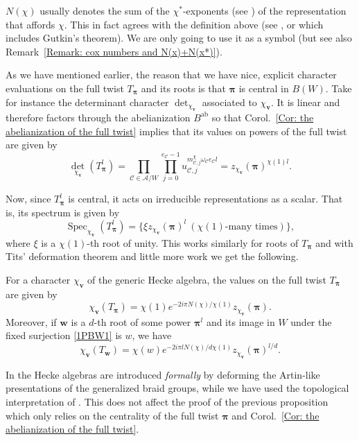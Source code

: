 \documentclass[ALCO, Unicode]{cedram}
\newcommand{\op}[1]{\operatorname{#1}}
\newcommand{\op}[1]{\operatorname{#1}}
\begin{document}
\begin{rema}\label{Remark: N(x) via coexponents}
$N(\chi)$ usually denotes the sum of the $\chi^{*}$-exponents (see \cite[Chapter~4:~\S4]{lehrer-taylor-book}) of the representation that affords $\chi$. This in fact agrees with the definition above (see \cite[Prop.~4.1]{broue-michel-french-paper}, or \cite[Lemma~10.15 and Remark~10.12]{lehrer-taylor-book} which includes Gutkin's theorem). We are only going to use it as a symbol (but see also Remark~\ref{Remark: cox numbers and N(x)+N(x*)}).
\end{rema}

As we have mentioned earlier, the reason that we have nice, explicit character evaluations on the full twist $T_{\bm\pi}$ and its roots is that $\bm\pi$ is central in $B(W)$. Take for instance the determinant character $\op{det}_{\chi_{\bm v}}$ associated to $\chi_{\bm v}$. It is linear and therefore factors through the abelianization $B^{\op{ab}}$ so that Corol.~\ref{Cor: the abelianization of the full twist} implies that its values on powers of the full twist are given by 
\[
\op{det}_{\chi_{\bm v}}(T_{\bm \pi}^l)=\prod_{\mathcal{C}\in\mathcal{A}/W}\prod_{j=0}^{e_{\mathcal{C}}-1}u_{\mathcal{C},j}^{m^{\chi}_{\mathcal{C},j}\omega_{\mathcal{C}}e_{\mathcal{C}}l}=z_{\chi_{\bm v}}(\bm \pi)^{\chi(1)l}.
\]

Now, since $T_{\bm\pi}^l$ is central, it acts on irreducible representations as a scalar. That is, its spectrum is given by $$\op{Spec}_{\chi_{\bm v}}(T_{\bm\pi}^l)=\{\xi z_{\chi_{\bm v}}(\bm\pi)^l\ (\chi(1)\text{-many times})\},$$ where $\xi$ is a $\chi(1)$-th root of unity. This works similarly for roots of $T_{\bm\pi}$ and with Tits' deformation theorem and little more work we get the following.

\begin{prop}\label{Prop: character values on roots of full twist}
For a character $\chi_{\bm v}$ of the generic Hecke algebra, the values on the full twist $T_{\bm\pi}$ are given by $$ \chi_{\bm v}(T_{\bm\pi})=\chi(1)e^{-2i\pi N(\chi)/\chi(1)}z_{\chi_{\bm v}}(\bm \pi).$$
Moreover, if $\bm w$ is a $d$-th root of some power $\bm\pi^l$ and its image in $W$ under the fixed surjection \eqref{1PBW1} is $w$, we have $$\chi_{\bm v}(T_{\bm w})=\chi(w)e^{-2i\pi lN(\chi)/d\chi(1)}z_{\chi_{\bm v}}(\bm\pi)^{l/d}. $$
\end{prop}

\begin{rema}
In \cite{broue-michel-french-paper} the Hecke algebras are introduced \emph{formally} by deforming the Artin-like presentations of the generalized braid groups, while we have used the topological interpretation of \cite{broue-malle-rouquier-braid-hecke}. This does not affect the proof of the previous proposition which only relies on the centrality of the full twist $\bm\pi$ and Corol.~\ref{Cor: the abelianization of the full twist}.
\end{rema}
\end{document}
